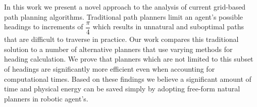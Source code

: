 

\noindent
In this work we present a novel approach to the analysis of current grid-based path planning algorithms. Traditional path planners limit an agent's possible headings to increments of $\dfrac{\pi}{4}$ which results in unnatural and suboptimal paths that are difficult to traverse in practice. Our work compares this traditional solution to a number of alternative planners that use varying methods for heading calculation. We prove that planners which are not limited to this subset of headings are significantly more efficient even when accounting for computational times. Based on these findings we believe a significant amount of time and physical energy can be saved simply by adopting free-form natural planners in robotic agent's.

\smallskip

